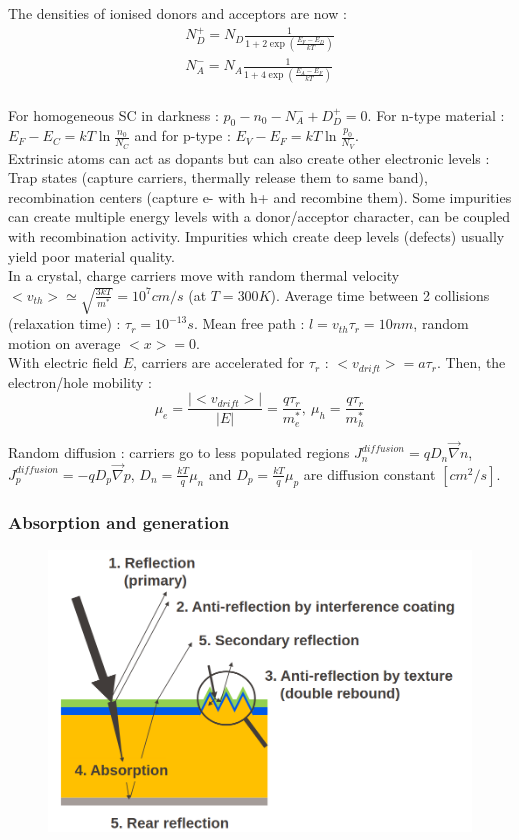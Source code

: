 \documentclass[../main.tex]{subfiles}
\begin{document}
The densities of ionised donors and acceptors are now : \begin{equation}
    \begin{gathered}
        N_D^+ = N_D \frac{1}{1+2\exp(\frac{E_F-E_D}{kT})}\\
        N_A^- = N_A \frac{1}{1+4\exp(\frac{E_A-E_F}{kT})}\\
    \end{gathered}
\end{equation}

For homogeneous SC in darkness : $p_0 - n_0 - N_A^- + D_D^+ = 0$. For n-type material : $E_F-E_C = kT\ln \frac{n_0}{N_C}$ and for p-type : $E_V-E_F = kT\ln \frac{p_0}{N_V}$.\\

Extrinsic atoms can act as dopants but can also create other electronic levels : Trap states (capture carriers, thermally release them to same band), recombination centers (capture e- with h+ and recombine them). Some impurities can create multiple energy levels with a donor/acceptor character, can be coupled with recombination activity. Impurities which create deep levels (defects) usually yield poor material quality.\\


In a crystal, charge carriers move with random thermal velocity $<v_{th}> \simeq \sqrt{\frac{3kT}{m^*}} = 10^7 cm/s$ (at $T=300K$). Average time between 2 collisions (relaxation time) : $\tau_r = 10^{-13}s$. Mean free path : $l=v_{th} \tau_r = 10nm$, random motion on average $<x> = 0$.\\

With electric field $E$, carriers are accelerated for $\tau_r$ : $<v_{drift}> = a \tau_r$. Then, the electron/hole mobility : \begin{equation}
    \mu_e = \frac{\lvert <v_{drift} >\rvert}{\lvert E \rvert} = \frac{q \tau_r}{m_e^*},\: \mu_h = \frac{q\tau_r}{m_h^*}
\end{equation}


Random diffusion : carriers go to less populated regions $J_n^{diffusion} = qD_n \vec{\nabla} n$, $J_p^{diffusion} = -qD_p \vec{\nabla} p$, $D_n = \frac{kT}{q} \mu_n$ and $D_p = \frac{kT}{q} \mu_p$ are diffusion constant $[cm^2/s]$.\\

\subsubsection{Absorption and generation}
\begin{figure}[hbt!]
    \centering
    \includegraphics[width=0.5\linewidth]{IMAGES/PV/Screenshot from 2025-03-25 13-21-33.png}
\end{figure}
\end{document}
